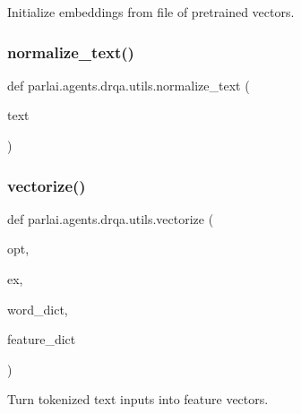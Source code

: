 \begin{DoxyVerb}Initialize embeddings from file of pretrained vectors.
\end{DoxyVerb}
 \mbox{\label{namespaceparlai_1_1agents_1_1drqa_1_1utils_a125ab4e64306060e9ecaa3999f7be6b6}} 
\subsubsection{\texorpdfstring{normalize\+\_\+text()}{normalize\_text()}}
{\footnotesize\ttfamily def parlai.\+agents.\+drqa.\+utils.\+normalize\+\_\+text (\begin{DoxyParamCaption}\item[{}]{text }\end{DoxyParamCaption})}

\mbox{\label{namespaceparlai_1_1agents_1_1drqa_1_1utils_a5c76cc39e3014c7bcf9199d566dbdc0f}} 
\subsubsection{\texorpdfstring{vectorize()}{vectorize()}}
{\footnotesize\ttfamily def parlai.\+agents.\+drqa.\+utils.\+vectorize (\begin{DoxyParamCaption}\item[{}]{opt,  }\item[{}]{ex,  }\item[{}]{word\+\_\+dict,  }\item[{}]{feature\+\_\+dict }\end{DoxyParamCaption})}

\begin{DoxyVerb}Turn tokenized text inputs into feature vectors.
\end{DoxyVerb}
 